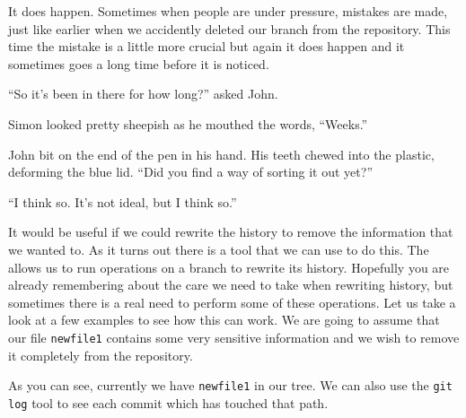 It does happen. Sometimes when people are under pressure, mistakes are made, just like earlier when we accidently deleted our branch from the repository.
This time the mistake is a little more crucial but again it does happen and it sometimes goes a long time before it is noticed.

\begin{trenches}
``So it's been in there for how long?'' asked John.

Simon looked pretty sheepish as he mouthed the words, ``Weeks.''

John bit on the end of the pen in his hand.
His teeth chewed into the plastic, deforming the blue lid.
``Did you find a way of sorting it out yet?''

``I think so. It's not ideal, but I think so.''
\end{trenches}

It would be useful if we could rewrite the history to remove the information that we wanted to.
As it turns out there is a tool that we can use to do this.
The  allows us to run operations on a branch to rewrite its history.
Hopefully you are already remembering about the care we need to take when rewriting history, but sometimes there is a real need to perform some of these operations.
Let us take a look at a few examples to see how this can work.
We are going to assume that our file \texttt{newfile1} contains some very sensitive information and we wish to remove it completely from the repository.


As you can see, currently we have \texttt{newfile1} in our tree.
We can also use the \texttt{git log} tool to see each commit which has touched that path.

